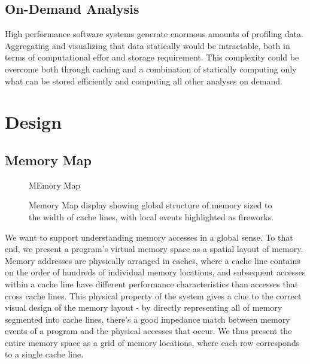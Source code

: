 \documentclass[annual]{acmsiggraph}
\begin{document}
  \subsection{On-Demand Analysis}
   
  High performance software systems generate enormous amounts of profiling data.
  Aggregating and visualizing that data statically would be intractable, 
    both in terms of computational effor and storage requirement.
  This complexity could be overcome both through caching and a combination of statically computing only what can
    be stored efficiently and computing all other analyses on demand.

\section{Design}\label{ch_d}
  \subsection{Memory Map}

  	\begin{figure}[t]
  		\centering
      MEmory Map
  		\caption{Memory Map display showing global structure of memory sized to the width of cache lines, with local events highlighted as fireworks.}
      \label{fig:system}
  	\end{figure}
  
  We want to support understanding memory accesses in a global sense. To that end, we present a program's virtual memory space as a spatial layout of memory. Memory addresses are physically arranged in caches, where a cache line contains on the order of hundreds of individual memory locations, and subsequent accesses within a cache line have different performance characteristics than accesses that cross cache lines. This physical property of the system gives a clue to the correct visual design of the memory layout - by directly representing all of memory segmented into cache lines, there's a good impedance match between memory events of a program and the physical accesses that occur. We thus present the entire memory space as a grid of memory locations, where each row corresponds to a single cache line.
  
\end{document}

